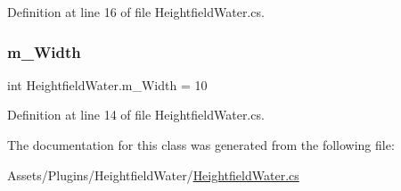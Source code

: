 Definition at line 16 of file Heightfield\+Water.\+cs.

\mbox{\label{class_heightfield_water_a5942aae2ab0702575d735da15a9deaea}} 
\subsubsection{\texorpdfstring{m\+\_\+\+Width}{m\_Width}}
{\footnotesize\ttfamily int Heightfield\+Water.\+m\+\_\+\+Width = 10}



Definition at line 14 of file Heightfield\+Water.\+cs.



The documentation for this class was generated from the following file\+:\begin{DoxyCompactItemize}
\item 
Assets/\+Plugins/\+Heightfield\+Water/\mbox{\hyperlink{_heightfield_water_8cs}{Heightfield\+Water.\+cs}}\end{DoxyCompactItemize}
